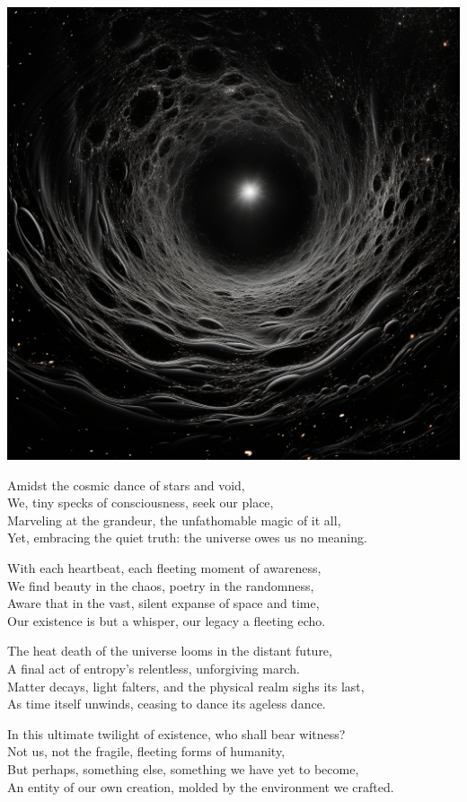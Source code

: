 \documentclass[10pt,letterpaper]{article}
\begin{document}
\pagestyle{empty} %

\begin{center}
\includegraphics[width=0.5\linewidth]{a_q_s_black_hole_alternate_dimension_time_Amidst_the_cosmic_dan_53144ebf-95fe-4515-905b-a83a234eefac.png}

\bigskip

Amidst the cosmic dance of stars and void,\\
We, tiny specks of consciousness, seek our place,\\
Marveling at the grandeur, the unfathomable magic of it all,\\
Yet, embracing the quiet truth: the universe owes us no meaning.\\

\bigskip

With each heartbeat, each fleeting moment of awareness,\\
We find beauty in the chaos, poetry in the randomness,\\
Aware that in the vast, silent expanse of space and time,\\
Our existence is but a whisper, our legacy a fleeting echo.\\

\bigskip

The heat death of the universe looms in the distant future,\\
A final act of entropy’s relentless, unforgiving march.\\
Matter decays, light falters, and the physical realm sighs its last,\\
As time itself unwinds, ceasing to dance its ageless dance.\\

\bigskip

In this ultimate twilight of existence, who shall bear witness?\\
Not us, not the fragile, fleeting forms of humanity,\\
But perhaps, something else, something we have yet to become,\\
An entity of our own creation, molded by the environment we crafted.\\


\end{center}
\end{document}

